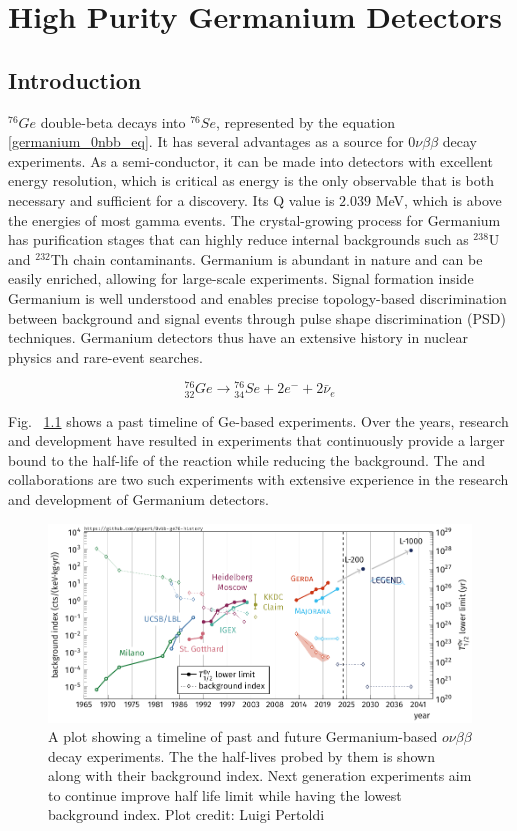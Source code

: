 \chapter{High Purity Germanium Detectors}
\label{chap:detectors}

\section{Introduction}
${}^{76}Ge$ double-beta decays into ${}^{76}Se$, represented by the equation \ref{germanium_0nbb_eq}. It has several advantages as a source for $0\nu\beta\beta$ decay experiments. As a semi-conductor, it can be made into detectors with excellent energy resolution, which is critical as energy is the only observable that is both necessary and sufficient for a discovery. Its Q value is $2.039$ MeV, which is above the energies of most gamma events. The crystal-growing process for Germanium has purification stages that can highly reduce internal backgrounds such as $^{238}$U and $^{232}$Th chain contaminants. Germanium is abundant in nature and can be easily enriched, allowing for large-scale experiments. Signal formation inside Germanium is well understood and enables precise topology-based discrimination between background and signal events through pulse shape discrimination (PSD) techniques. Germanium detectors thus have an extensive history in nuclear physics and rare-event searches.


\begin{equation}\label{germanium_0nbb_eq}
{}_{32}^{76}Ge \rightarrow {}_{34}^{76}Se + 2e^- + 2\bar{\nu}_e
\end{equation}

Fig. ~\ref{past_ge_exp} shows a past timeline of Ge-based experiments. Over the years, research and development have resulted in experiments that continuously provide a larger bound to the half-life of the reaction while reducing the background. The {\MJ} and {\Gerda} collaborations are two such experiments with extensive experience in the research and development of Germanium detectors.

\begin{figure}[!htb]
\centering
\includegraphics[trim=0.1cm 0 0.1cm 0,clip, width=0.99\linewidth]{ch2/figs/0nbb-ge76-history-future.pdf}
\caption{A plot showing a timeline of past and future Germanium-based $o\nu\beta\beta$ decay experiments. The the half-lives probed by them is shown along with their background index. Next generation experiments aim to continue improve half life limit while having the lowest background index. Plot credit: Luigi Pertoldi}
\label{past_ge_exp}
\end{figure}



